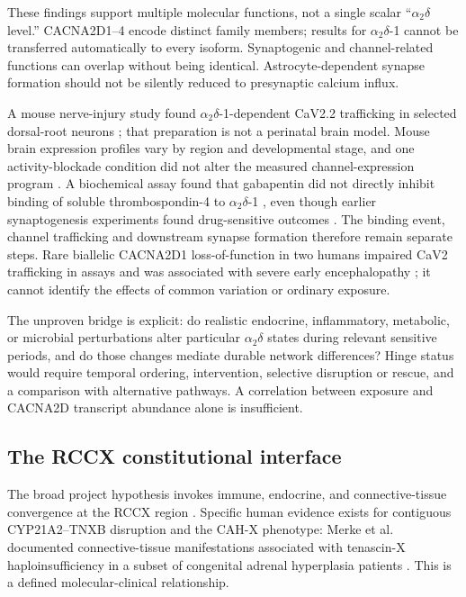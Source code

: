 These findings support multiple molecular functions, not a single scalar “\ensuremath{\alpha_2\delta} level.” CACNA2D1–4 encode distinct family members; results for \ensuremath{\alpha_2\delta}-1 cannot be transferred automatically to every isoform. Synaptogenic and channel-related functions can overlap without being identical. Astrocyte-dependent synapse formation should not be silently reduced to presynaptic calcium influx.

A mouse nerve-injury study found \ensuremath{\alpha_2\delta}-1-dependent CaV2.2 trafficking in selected dorsal-root neurons \cite{ref29}; that preparation is not a perinatal brain model. Mouse brain expression profiles vary by region and developmental stage, and one activity-blockade condition did not alter the measured channel-expression program \cite{ref30}. A biochemical assay found that gabapentin did not directly inhibit binding of soluble thrombospondin-4 to \ensuremath{\alpha_2\delta}-1 \cite{ref31}, even though earlier synaptogenesis experiments found drug-sensitive outcomes \cite{ref10}. The binding event, channel trafficking and downstream synapse formation therefore remain separate steps. Rare biallelic CACNA2D1 loss-of-function in two humans impaired CaV2 trafficking in assays and was associated with severe early encephalopathy \cite{ref35}; it cannot identify the effects of common variation or ordinary exposure.

The unproven bridge is explicit: do realistic endocrine, inflammatory, metabolic, or microbial perturbations alter particular \ensuremath{\alpha_2\delta} states during relevant sensitive periods, and do those changes mediate durable network differences? Hinge status would require temporal ordering, intervention, selective disruption or rescue, and a comparison with alternative pathways. A correlation between exposure and CACNA2D transcript abundance alone is insufficient.


\subsection{The RCCX constitutional interface}

The broad project hypothesis invokes immune, endocrine, and connective-tissue convergence at the RCCX region \cite{projP1}. Specific human evidence exists for contiguous CYP21A2–TNXB disruption and the CAH-X phenotype: Merke et al. documented connective-tissue manifestations associated with tenascin-X haploinsufficiency in a subset of congenital adrenal hyperplasia patients \cite{ref13}. This is a defined molecular-clinical relationship.

